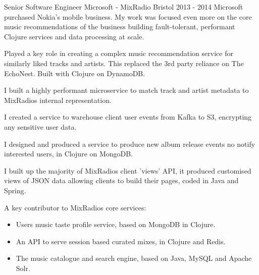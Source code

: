 \begin{cventries}
    \cventrypara
    {Senior Software Engineer} %
    {Microsoft - MixRadio} %
    {Bristol} %
    {2013 - 2014} %
    {Microsoft purchased Nokia's mobile business. My work was focused even more on the core music recommendations of
    the business building fault-tolerant, performant Clojure services and data processing at scale.}
    {
        \begin{cvitems} %
            \item {Played a key role in creating a complex music recommendation service for similarly liked tracks
            and artists.
            This replaced the 3rd party reliance on The EchoNest. Built with Clojure on DynamoDB.}
            \item {I built a highly performant microservice to match track and artist metadata to MixRadios internal
            representation.}
            \item {I created a service to warehouse client user events from Kafka to S3, encrypting any sensitive
            user data.}
            \item {I designed and produced a service to produce new album release events no notify interested users,
                in Clojure on MongoDB.}
            \item {I built up the majority of MixRadios client ’views’ API, it produced customised views of JSON data
            allowing clients to build their pages, coded in Java and Spring.}
            \item {A key contributor to MixRadios core services:
                \begin{itemize}
                    \item Users music taste profile service, based on MongoDB in Clojure.
                    \item An API to serve session based curated mixes, in Clojure and Redis.
                    \item The music catalogue and search engine, based on Java, MySQL and Apache Solr.
                \end{itemize}}
        \end{cvitems}
    }


\end{cventries}
